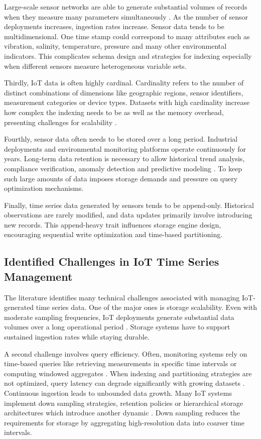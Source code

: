 Large-scale sensor networks are able to generate substantial volumes of records when they measure many parameters simultaneously \cite{srivastava2026architectural, Jensen2017}. As the number of sensor deployments increases, ingestion rates increase. Sensor data tends to be multidimensional. One time stamp could correspond to many attributes such as vibration, salinity, temperature, pressure and many other environmental indicators. This complicates schema design and strategies for indexing especially when different sensors measure heterogeneous variable sets. 

Thirdly, IoT data is often highly cardinal. Cardinality refers to the number of distinct combinations of dimensions like geographic regions, sensor identifiers, measurement categories or device types. Datasets with high cardinality increase how complex the indexing needs to be as well as the memory overhead, presenting challenges for scalability \cite{srivastava2026architectural}.

Fourthly, sensor data often needs to be stored over a long period. Industrial deployments and environmental monitoring platforms operate continuously for years. Long-term data retention is necessary to allow historical trend analysis, compliance verification, anomaly detection and predictive modeling \cite{iiot_world_retention2024}. To keep such large amounts of data imposes storage demands and pressure on query optimization mechanisms.

Finally, time series data generated by sensors tends to be append-only. Historical observations are rarely modified, and data updates primarily involve introducing new records. This append-heavy trait influences storage engine design, encouraging sequential write optimization and time-based partitioning.



\subsection{Identified Challenges in IoT Time Series Management}
The literature identifies many technical challenges associated with managing IoT-generated time series data. One of the major ones is storage scalability. Even with moderate sampling frequencies, IoT deployments generate substantial data volumes over a long operational period \cite{GUBBI20131645}. Storage systems have to support sustained ingestion rates while staying durable.

A second challenge involves query efficiency. Often, monitoring systems rely on time-based queries like retrieving measurements in specific time intervals or computing windowed aggregates \citep{Jensen2017}. When indexing and partitioning strategies are not optimized, query latency can degrade significantly with growing datasets \citep{postgresql_partitioning}. Continuous ingestion leads to unbounded data growth. Many IoT systems implement down sampling strategies, retention policies or hierarchical storage architectures which introduce another dynamic \citep{iiot_world_retention2024}. Down sampling reduces the requirements for storage by aggregating high-resolution data into coarser time intervals.

